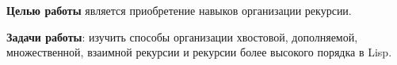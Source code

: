 \Introduction

\textbf{Целью работы} является приобретение навыков организации рекурсии.

\textbf{Задачи работы}: изучить способы организации хвостовой, дополняемой, множественной, взаимной рекурсии и рекурсии более высокого порядка в Lisp.

